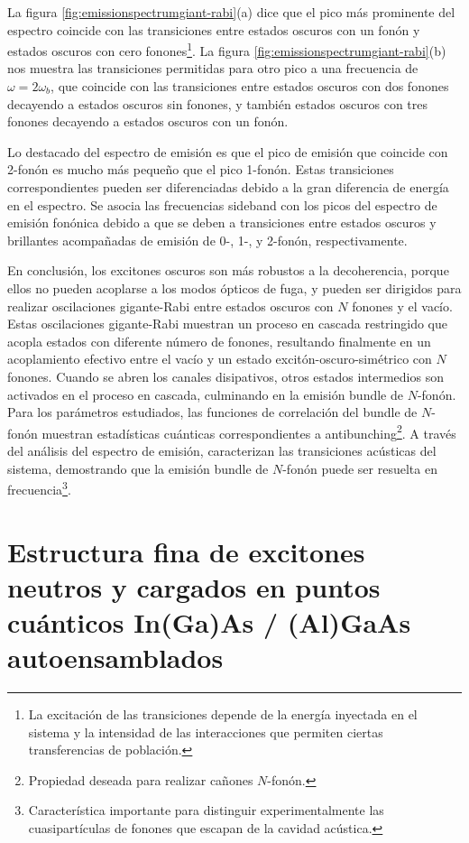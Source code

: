 \documentclass[../main.tex]{subfiles}
\begin{document}
La figura \ref{fig:emissionspectrumgiant-rabi}(a) dice que  el pico más prominente del espectro coincide con las transiciones  entre estados oscuros con un fonón y estados oscuros con cero fonones\footnote{La excitación de las transiciones depende de la energía inyectada en el sistema y la intensidad de las interacciones que permiten ciertas transferencias de población.}. La figura \ref{fig:emissionspectrumgiant-rabi}(b) nos muestra las transiciones permitidas para otro pico a una frecuencia de $\omega = 2\omega_b$, que coincide con las transiciones entre estados oscuros con dos fonones decayendo a estados oscuros sin fonones, y también estados oscuros con tres fonones decayendo a estados oscuros con un fonón. 

Lo destacado del espectro de emisión es que el pico de emisión que coincide con 2-fonón es mucho más pequeño que el pico 1-fonón. Estas transiciones correspondientes pueden ser diferenciadas debido a la gran diferencia de energía en el espectro. Se asocia las frecuencias sideband con los picos del espectro de emisión fonónica debido a que se deben a transiciones entre estados oscuros y brillantes acompañadas de emisión de 0-, 1-, y 2-fonón, respectivamente.

En conclusión, los excitones oscuros son más robustos a la decoherencia, porque ellos no pueden acoplarse a los modos ópticos de fuga, y pueden ser dirigidos para realizar oscilaciones gigante-Rabi entre estados oscuros con $N$ fonones y el vacío. Estas oscilaciones gigante-Rabi muestran un proceso en cascada restringido que acopla estados con diferente número de fonones, resultando finalmente en un acoplamiento efectivo entre el vacío y un estado excitón-oscuro-simétrico con $N$ fonones. Cuando se abren los canales disipativos, otros estados intermedios son activados en el proceso en cascada, culminando en la emisión bundle de $N$-fonón. Para los parámetros estudiados, las funciones de correlación del bundle de $N$-fonón muestran estadísticas cuánticas correspondientes a antibunching\footnote{Propiedad deseada para realizar cañones $N$-fonón.}. A través del análisis del espectro de emisión, caracterizan las transiciones acústicas del sistema, demostrando que la emisión bundle de $N$-fonón puede ser resuelta en frecuencia\footnote{Característica importante para distinguir experimentalmente las cuasipartículas de fonones que escapan de la cavidad acústica.}.

%
\section{Estructura fina de excitones neutros y cargados en puntos cuánticos In(Ga)As / (Al)GaAs autoensamblados}
\end{document}
